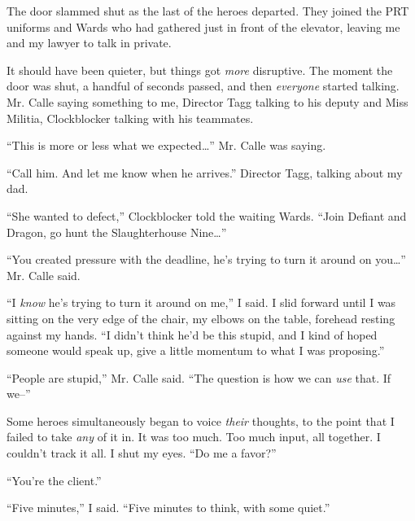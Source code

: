 





The door slammed shut as the last of the heroes departed.  They joined the PRT uniforms and Wards who had gathered just in front of the elevator, leaving me and my lawyer to talk in private.



It should have been quieter, but things got \emph{more} disruptive.  The moment the door was shut, a handful of seconds passed, and then \emph{everyone} started talking.  Mr. Calle saying something to me, Director Tagg talking to his deputy and Miss Militia, Clockblocker talking with his teammates.



``This is more or less what we expected\ldots'' Mr. Calle was saying.



``Call him.  And let me know when he arrives.'' Director Tagg, talking about my dad.



``She wanted to defect,'' Clockblocker told the waiting Wards.  ``Join Defiant and Dragon, go hunt the Slaughterhouse Nine\ldots''



``You created pressure with the deadline, he's trying to turn it around on you\ldots'' Mr. Calle said.



``I \emph{know} he's trying to turn it around on me,'' I said.  I slid forward until I was sitting on the very edge of the chair, my elbows on the table, forehead resting against my hands.  ``I didn't think he'd be this stupid, and I kind of hoped someone would speak up, give a little momentum to what I was proposing.''



``People are stupid,'' Mr. Calle said.  ``The question is how we can \emph{use} that.  If we--''



Some heroes simultaneously began to voice \emph{their} thoughts, to the point that I failed to take \emph{any} of it in.  It was too much.  Too much input, all together.  I couldn't track it all.  I shut my eyes.  ``Do me a favor?''



``You're the client.''



``Five minutes,'' I said.  ``Five minutes to think, with some quiet.''



